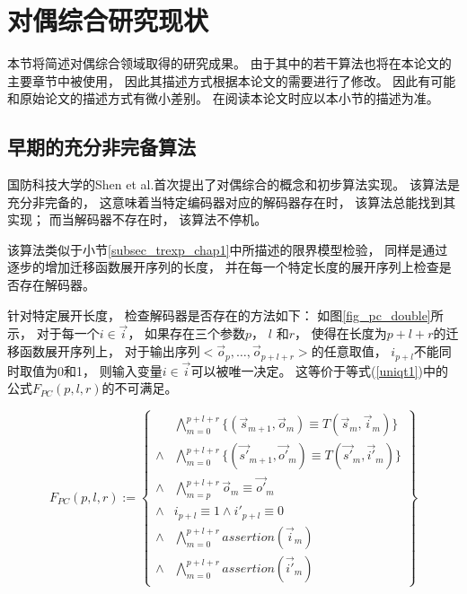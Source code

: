 \section{对偶综合研究现状}\label{sec_now}
本节将简述对偶综合领域取得的研究成果。
由于其中的若干算法也将在本论文的主要章节中被使用，
因此其描述方式根据本论文的需要进行了修改。
因此有可能和原始论文的描述方式有微小差别。
在阅读本论文时应以本小节的描述为准。

\subsection{早期的充分非完备算法}\label{subsec_sound}

国防科技大学的Shen et al.首次提出了对偶综合的概念和初步算法实现。
该算法是充分非完备的，
这意味着当特定编码器对应的解码器存在时，
该算法总能找到其实现；
而当解码器不存在时，
该算法不停机。

该算法类似于小节\ref{subsec_trexp_chap1}中所描述的限界模型检验，
同样是通过逐步的增加迁移函数展开序列的长度，
并在每一个特定长度的展开序列上检查是否存在解码器。

针对特定展开长度，
检查解码器是否存在的方法如下：
如图\ref{fig_pc_double}所示，
对于每一个$i\in\vec{i}$，
如果存在三个参数$p$， $l$ 和$r$，
使得在长度为$p+l+r$的迁移函数展开序列上，
对于输出序列$<\vec{o}_p,\dots,\vec{o}_{p+l+r}>$的任意取值，
$i_{p+l}$不能同时取值为0和1，
则输入变量$i\in\vec{i}$可以被唯一决定。
这等价于等式(\ref{uniqt1})中的公式$F_{PC}(p,l,r)$的不可满足。

\begin{equation}\label{uniqt1}
F_{PC}(p,l,r):=
\left\{
\begin{array}{cc}
&\bigwedge_{m=0}^{p+l+r}
\{
(\vec{s}_{m+1},\vec{o}_m)\equiv T(\vec{s}_m,\vec{i}_m)
\}
\\
\wedge&\bigwedge_{m=0}^{p+l+r}
\{
(\vec{s'}_{m+1},\vec{o'}_m)\equiv T(\vec{s'}_m,\vec{i'}_m)
\}
\\
\wedge&\bigwedge_{m=p}^{p+l+r}\vec{o}_m\equiv \vec{o'}_m \\
\wedge& i_{p+l}\equiv 1 \wedge  i'_{p+l}\equiv 0 \\
\wedge&\bigwedge_{m=0}^{p+l+r}assertion(\vec{i}_m) \\
\wedge&\bigwedge_{m=0}^{p+l+r}assertion(\vec{i'}_m)
\end{array}
\right\}
\end{equation}

